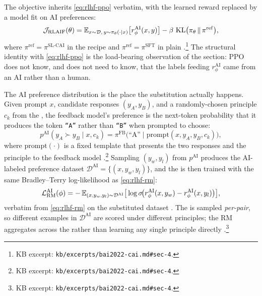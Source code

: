 The  objective inherits \cref{eq:rlhf-ppo} verbatim, with the
learned reward replaced by a model fit on AI preferences:
\begin{equation}
\mathcal{J}_{\mathrm{RLAIF}}(\theta)
  = \operatorname{\mathbb{E}}_{x \sim \mathcal{D},\, y \sim \pi_\theta(\cdot \mid x)}\!\big[r_\phi^{\mathrm{AI}}(x, y)\big]
    - \beta \, \operatorname{KL}\!\big(\pi_\theta \,\|\, \pi^{\mathrm{ref}}\big),
\label{eq:rlaif-objective}
\end{equation}
where $\pi^{\mathrm{ref}} = \pi^{\mathrm{SL\text{-}CAI}}$ in the 
recipe and $\pi^{\mathrm{ref}} = \pi^{\mathrm{SFT}}$ in plain 
\citep[\S 4]{bai2022-cai}.\footnote{KB excerpt:
\texttt{kb/excerpts/bai2022-cai.md\#sec-4}.} The structural identity
with \cref{eq:rlhf-ppo} is the load-bearing observation of the section:
PPO does not know, and does not need to know, that the labels feeding
$r_\phi^{\mathrm{AI}}$ came from an AI rather than a human.

The AI preference distribution is the place the substitution actually
happens. Given prompt $x$, candidate responses $(y_A, y_B)$, and a
randomly-chosen principle $c_k$ from the , the feedback
model's preference is the next-token probability that it produces the
token \texttt{``A''} rather than \texttt{``B''} when prompted to choose:
\begin{equation}
p^{\mathrm{AI}}(y_A \succ y_B \mid x, c_k)
  = \pi^{\mathrm{FB}}\!\big(\text{``A''} \mid \mathrm{prompt}(x, y_A, y_B, c_k)\big),
\label{eq:rlaif-pref}
\end{equation}
where $\mathrm{prompt}(\cdot)$ is a fixed template that presents the
two responses and the principle to the feedback model
\citep[\S 4]{bai2022-cai}.\footnote{KB excerpt:
\texttt{kb/excerpts/bai2022-cai.md\#sec-4}.} Sampling $(y_w, y_l)$
from $p^{\mathrm{AI}}$ produces the AI-labeled preference dataset
$\mathcal{D}^{\mathrm{AI}} = \{(x, y_w, y_l)\}$, and the 
is then trained with the same Bradley--Terry log-likelihood as
\cref{eq:rlhf-rm}:
\begin{equation}
\mathcal{L}_{\mathrm{RM}}^{\mathrm{AI}}(\phi)
  = -\operatorname{\mathbb{E}}_{(x, y_w, y_l) \sim \mathcal{D}^{\mathrm{AI}}}
       \!\big[\log \sigma\!\big(r_\phi^{\mathrm{AI}}(x, y_w) - r_\phi^{\mathrm{AI}}(x, y_l)\big)\big],
\label{eq:rlaif-rm}
\end{equation}
verbatim from \cref{eq:rlhf-rm} on the substituted dataset
\citep[\S 4]{bai2022-cai}. The  is sampled \emph{per-pair},
so different examples in $\mathcal{D}^{\mathrm{AI}}$ are scored under
different principles; the RM aggregates across the  rather
than learning any single principle directly
\citep[\S 4]{bai2022-cai}.\footnote{KB excerpt:
\texttt{kb/excerpts/bai2022-cai.md\#sec-4}.}

